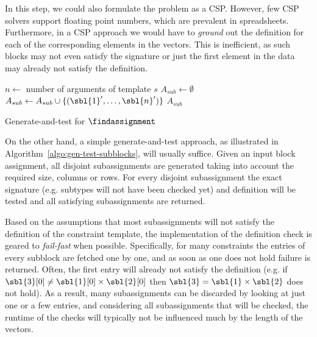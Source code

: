 In this step, we could also formulate the problem as a CSP. %
However, few CSP solvers support floating point numbers, which are prevalent in spreadsheets.
Furthermore, in a CSP approach we would have to \textit{ground} out the definition for each of the corresponding elements in the vectors.
This is inefficient, as such blocks may not even satisfy the signature or just the first element in the data may already not satisfy the definition.

\begin{algorithm}[tbh]
  \begin{algorithmic}
    \footnotesize
    \State $n \gets$ number of arguments of template $s$
    \State $A_{sub} \gets \emptyset$
        \State $A_{sub} \gets A_{sub} \cup \{ (\sbl{1}', \dots, \sbl{n}') \}$
      \EndIf
    \EndFor
\Return $A_{sub}$
\EndProcedure
\end{algorithmic}
\caption{Generate-and-test for $\findassignment$}
\label{algo:gen-test-subblocks}
\end{algorithm}


On the other hand, a simple generate-and-test approach, as illustrated in Algorithm~\ref{algo:gen-test-subblocks}, will usually suffice.
Given an input block assignment, all disjoint subassignments are generated taking into account the required size, columns or rows.
For every disjoint subassignment the exact signature (e.g. subtypes will not have been checked yet) and definition will be tested and all satisfying subassignments are returned.


Based on the assumptions that most subassignments will not satisfy the definition of the constraint template, the implementation of the definition check is geared to \textit{fail-fast} when possible.
Specifically, for many constraints the entries of every subblock are fetched one by one, and as soon as one does not hold failure is returned.
Often, the first entry will already not satisfy the definition (e.g. if $\sbl{3}[0] \neq \sbl{1}[0] \times \sbl{2}[0]$ then $\sbl{3} = \sbl{1} \times \sbl{2}$ does not hold).
As a result, many subassignments can be discarded by looking at just one or a few entries, and considering all subassignments that will be checked, the runtime of the checks will typically not be influenced much by the length of the vectors.




